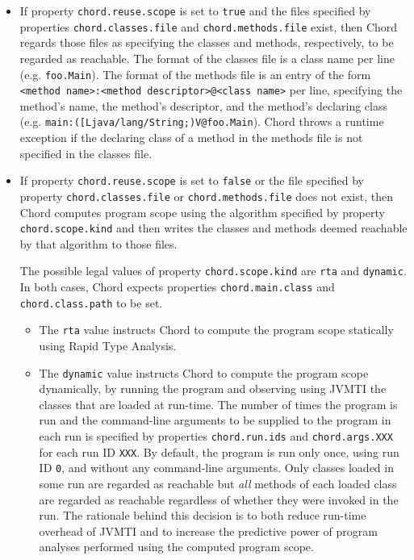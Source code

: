 \documentclass{article}
\begin{document}
\begin{itemize}
\item
If property \verb+chord.reuse.scope+ is set to \verb+true+ and the files specified by
properties \verb+chord.classes.file+ and \verb+chord.methods.file+ exist,
then Chord regards those files as specifying the classes and methods, respectively,
to be regarded as reachable.  The format
of the classes file is a class name per line (e.g. \verb+foo.Main+).  The format
of the methods file is an entry of the form \verb+<method name>:<method descriptor>@<class name>+ per line,
specifying the method's name, the method's descriptor, and the method's declaring class
(e.g. \verb+main:([Ljava/lang/String;)V@foo.Main+).
Chord throws a runtime exception if the declaring class of a method in the methods file is not
specified in the classes file.
\item
If property \verb+chord.reuse.scope+ is set to \verb+false+ or the file specified by
property \verb+chord.classes.file+ or \verb+chord.methods.file+ does not exist,
then Chord computes program scope
using the algorithm specified by property \verb+chord.scope.kind+ and then
writes the classes and methods deemed reachable by that algorithm to those files.

The possible legal values of property \verb+chord.scope.kind+ are \verb+rta+ and \verb+dynamic+.
In both cases, Chord expects properties \verb+chord.main.class+ and \verb+chord.class.path+
to be set.
\begin{itemize}
\item
The \verb+rta+ value instructs Chord to compute the program scope statically using Rapid Type Analysis.
\item
The \verb+dynamic+ value instructs Chord to compute the program scope dynamically, by running the program
and observing using JVMTI the classes that are loaded at run-time.
The number of times the program is run and the command-line arguments to be supplied to
the program in each run is specified by properties \verb+chord.run.ids+ and
\verb+chord.args.XXX+ for each run ID \verb+XXX+.  By default, the program is run only once, using run ID \verb+0+,
and without any command-line arguments.
Only classes loaded in some run are regarded as reachable but {\it all} methods of each loaded class are regarded
as reachable regardless of whether they were invoked in the run.
The rationale behind this decision is to both reduce run-time overhead of JVMTI and to increase the
predictive power of program analyses performed using the computed program scope.
\end{itemize}
\end{itemize}
\end{document}
